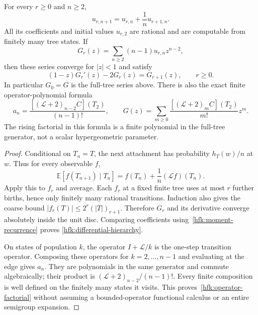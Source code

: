 \begin{proposition}
\label{hfk:hierarchy}
For every $r\ge0$ and $n\ge2$,
\begin{equation}\label{hfk:moment-recurrence}
 u_{r,n+1}=u_{r,n}+\frac1n u_{r+1,n}.
\end{equation}
All its coefficients and initial values $u_{r,2}$ are rational and
are computable from finitely many tree states. If
\[
 G_r(z)=\sum_{n\ge2}(n-1)u_{r,n}z^{n-2},
\]
then these series converge for $|z|<1$ and satisfy
\begin{equation}\label{hfk:differential-hierarchy}
 (1-z)G_r'(z)-2G_r(z)=G_{r+1}(z),\qquad r\ge0.
\end{equation}
In particular $G_0=G$ is the full-tree series above. There is also
the exact finite operator-polynomial formula
\begin{equation}\label{hfk:operator-factorial}
 a_n=\frac{[(\mathcal L+2)_{n-2}C](T_2)}{(n-1)!},
 \qquad
 G(z)=\sum_{m\ge0}\frac{[(\mathcal L+2)_mC](T_2)}{m!}z^m.
\end{equation}
The rising factorial in this formula is a finite polynomial in the
full-tree generator, not a scalar hypergeometric parameter.
\end{proposition}
\begin{proof}
Conditional on $T_n=T$, the next attachment has probability
$h_T(w)/n$ at $w$. Thus for every observable $f$,
\[
 \mathbb E[f(T_{n+1})\mid T_n]
 =f(T_n)+\frac1n(\mathcal Lf)(T_n).
\]
Apply this to $f_r$ and average. Each $f_r$ at a fixed finite tree
uses at most $r$ further births, hence only finitely many rational
transitions. Induction also gives the coarse bound
$|f_r(T)|\le2^r(|T|)_{r+1}$. Therefore $G_r$ and its derivative
converge absolutely inside the unit disc. Comparing coefficients
using~\eqref{hfk:moment-recurrence} proves
\eqref{hfk:differential-hierarchy}.

On states of population $k$, the operator $I+\mathcal L/k$ is the
one-step transition operator. Composing these operators for
$k=2,\ldots,n-1$ and evaluating at the edge gives $a_n$.
They are polynomials in the same generator and commute algebraically;
their product is $(\mathcal L+2)_{n-2}/(n-1)!$. Every finite
composition is well defined on the finitely many states it visits.
This proves~\eqref{hfk:operator-factorial} without assuming a
bounded-operator functional calculus or an entire semigroup expansion.
\end{proof}

